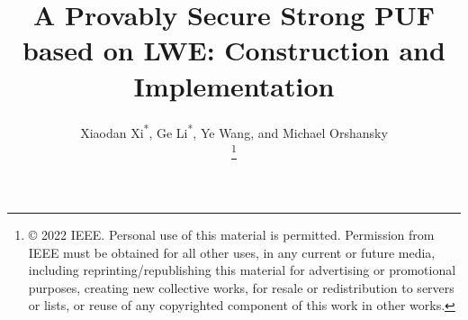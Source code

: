 \documentclass[9.5pt,journal,compsoc]{IEEEtran}
\begin{document}


\title{A Provably Secure Strong PUF based on LWE: Construction and Implementation}

\author{Xiaodan Xi\textsuperscript{*}, Ge Li\textsuperscript{*}, Ye Wang, and Michael Orshansky

\thanks {© 2022 IEEE.  Personal use of this material is permitted.  Permission from IEEE must be obtained for all other uses, in any current or future media, including reprinting/republishing this material for advertising or promotional purposes, creating new collective works, for resale or redistribution to servers or lists, or reuse of any copyrighted component of this work in other works.}}
\end{document}
